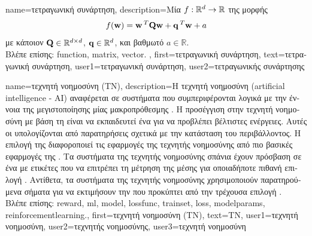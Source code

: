 {name={\foreignlanguage{greek}{τετραγωνική συνάρτηση}},
	description={\foreignlanguage{greek}{Μία}  
		$f: \mathbb{R}^{d} \rightarrow \mathbb{R}$ \foreignlanguage{greek}{της μορφής}  
		$$f({\bf w}) =  {\bf w}\,^{T} \mathbf{Q} \mathbf{w} + \mathbf{q}\,^{T} {\bf w}+a$$  
		\foreignlanguage{greek}{με κάποιον}  $\mathbf{Q} \in \mathbb{R}^{d \times d}$, 
		 ${\bf q} \in \mathbb{R}^{d}$, \foreignlanguage{greek}{και βαθμωτό} $a \in \mathbb{R}$. \\
		\foreignlanguage{greek}{Βλέπε επίσης:} \gls{function}, \gls{matrix}, \gls{vector}. },
	first={\foreignlanguage{greek}{τετραγωνική συνάρτηση}},
	text={\foreignlanguage{greek}{τετραγωνική συνάρτηση}},
	user1={\foreignlanguage{greek}{τετραγωνική συνάρτηση}}, %
  	user2={\foreignlanguage{greek}{τετραγωνικής συνάρτησης}} %
}

{name={\foreignlanguage{greek}{τεχνητή νοημοσύνη (ΤΝ)}}, 
	description={\foreignlanguage{greek}{Η τεχνητή νοημοσύνη} (artificial intelligence - AI) 
		\foreignlanguage{greek}{αναφέρεται σε συστήματα που συμπεριφέρονται λογικά με την έννοια της  
		μεγιστοποίησης μίας μακροπρόθεσμης} . \foreignlanguage{greek}{Η προσέγγιση στην τεχνητή νοημοσύνη με βάση
		τη}  \foreignlanguage{greek}{είναι να εκπαιδευτεί ένα}  \foreignlanguage{greek}{για   
		να προβλέπει βέλτιστες ενέργειες. Αυτές οι}  \foreignlanguage{greek}{υπολογίζονται από 
		παρατηρήσεις σχετικά με την κατάσταση του περιβάλλοντος. Η επιλογή της} 
		 \foreignlanguage{greek}{διαφοροποιεί τις εφαρμογές της τεχνητής νοημοσύνης από πιο βασικές  
		εφαρμογές της} . \foreignlanguage{greek}{Τα συστήματα της τεχνητής νοημοσύνης σπάνια έχουν 
		πρόσβαση σε ένα}  \foreignlanguage{greek}{με ετικέτες που να επιτρέπει τη μέτρηση της 
		μέσης}  \foreignlanguage{greek}{για οποιαδήποτε πιθανή επιλογή} . 
		\foreignlanguage{greek}{Αντίθετα, τα συστήματα της τεχνητής νοημοσύνης χρησιμοποιούν παρατηρούμενα σήματα}  
		 \foreignlanguage{greek}{για να εκτιμήσουν την}  \foreignlanguage{greek}{που 
		προκύπτει από την τρέχουσα επιλογή} .\\
		\foreignlanguage{greek}{Βλέπε επίσης:} \gls{reward}, \gls{ml}, \gls{model}, \gls{lossfunc}, \gls{trainset}, \gls{loss}, \glspl{modelparam}, \gls{reinforcementlearning}.},
	first={\foreignlanguage{greek}{τεχνητή νοημοσύνη (ΤΝ)}},
	text={\foreignlanguage{greek}{ΤΝ}},
	user1={\foreignlanguage{greek}{τεχνητή νοημοσύνη}}, %
	user2={\foreignlanguage{greek}{τεχνητής νοημοσύνης}}, %
	user3={\foreignlanguage{greek}{τεχνητή νοημοσύνη}} %
}

